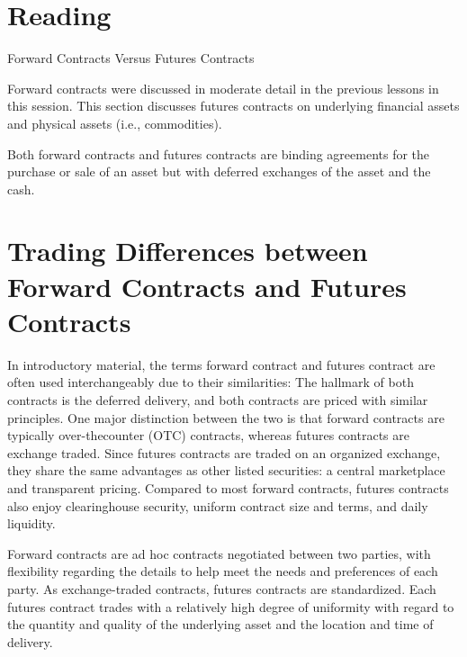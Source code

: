 \documentclass[11pt]{article}
\begin{document}
\section*{Reading}
Forward Contracts Versus Futures Contracts

Forward contracts were discussed in moderate detail in the previous lessons in this session. This section discusses futures contracts on underlying financial assets and physical assets (i.e., commodities).

Both forward contracts and futures contracts are binding agreements for the purchase or sale of an asset but with deferred exchanges of the asset and the cash.

\section*{Trading Differences between Forward Contracts and Futures Contracts}
In introductory material, the terms forward contract and futures contract are often used interchangeably due to their similarities: The hallmark of both contracts is the deferred delivery, and both contracts are priced with similar principles. One major distinction between the two is that forward contracts are typically over-thecounter (OTC) contracts, whereas futures contracts are exchange traded. Since futures contracts are traded on an organized exchange, they share the same advantages as other listed securities: a central marketplace and transparent pricing. Compared to most forward contracts, futures contracts also enjoy clearinghouse security, uniform contract size and terms, and daily liquidity.

Forward contracts are ad hoc contracts negotiated between two parties, with flexibility regarding the details to help meet the needs and preferences of each party. As exchange-traded contracts, futures contracts are standardized. Each futures contract trades with a relatively high degree of uniformity with regard to the quantity and quality of the underlying asset and the location and time of delivery.
\end{document}
